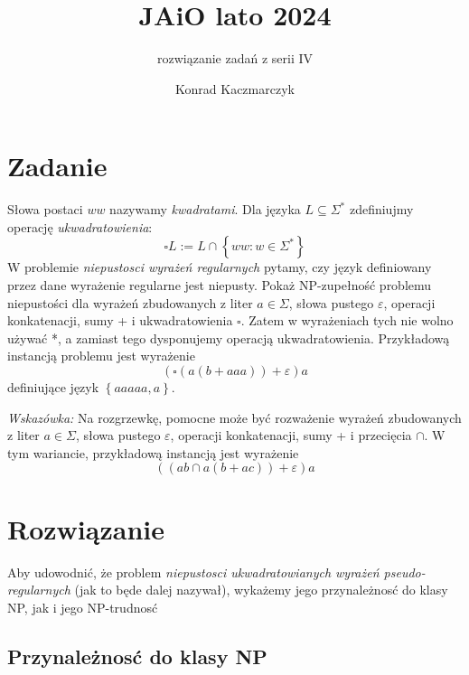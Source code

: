 \documentclass[11pt]{scrartcl}
\author{Konrad Kaczmarczyk}
\begin{document}
  \title{JAiO lato 2024}
  \subtitle{rozwiązanie zadań z serii IV}
  \maketitle
    \section{Zadanie}
        \begin{zadanie}
            Słowa postaci $ww$ nazywamy \textit{kwadratami}. Dla języka $L \subseteq \Sigma^*$ zdefiniujmy operację \textit{ukwadratowienia}:
            \[
                \square L := L \cap \left \{ ww : w \in \Sigma^* \right \}
            \]
            W problemie \textit{niepustosci wyrażeń regularnych} pytamy, czy język definiowany przez dane wyrażenie regularne jest niepusty. Pokaż NP-zupełność problemu niepustości dla wyrażeń zbudowanych z liter $a \in \Sigma$, słowa pustego $\varepsilon$, operacji konkatenacji, sumy + i ukwadratowienia $\square$. Zatem w wyrażeniach tych nie wolno używać *, a zamiast tego dysponujemy operacją ukwadratowienia. Przykładową instancją problemu jest wyrażenie 
            \[
            \left ( \square \left ( a \left ( b + aaa \right ) \right ) + \varepsilon \right )a
            \]
            definiujące język $\left \{ aaaaa, a \right \}$.

            \textit{Wskazówka:} Na rozgrzewkę, pomocne może być rozważenie wyrażeń zbudowanych z liter $a \in \Sigma$, słowa pustego $\varepsilon$, operacji konkatenacji, sumy + i przecięcia $\cap$. W tym wariancie, przykładową instancją jest wyrażenie
            \[
                \left ( \left ( ab \cap a(b + ac) \right ) + \varepsilon \right )a
            \]
            
        \end{zadanie}
  \section{Rozwiązanie}
      Aby udowodnić, że problem \textit{niepustosci ukwadratowianych wyrażeń pseudo-regularnych} (jak to będe dalej nazywał), wykażemy jego przynależnosć do klasy NP, jak i jego NP-trudnosć
      
      \subsection*{Przynależnosć do klasy NP}
      
\end{document}
